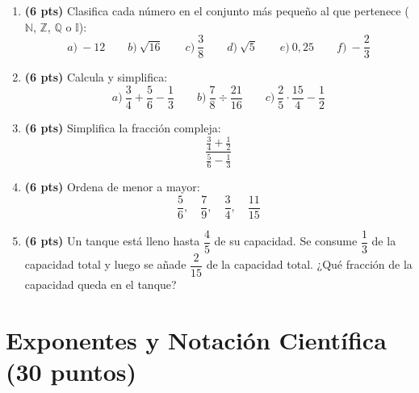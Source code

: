 \documentclass[12pt, letterpaper]{article}
\newcommand{\N}{\mathbb{N}}
\newcommand{\Z}{\mathbb{Z}}
\newcommand{\Q}{\mathbb{Q}}
\newcommand{\I}{\mathbb{I}}
\begin{document}
\begin{enumerate}[leftmargin=*]
  \item \textbf{(6 pts)} Clasifica cada número en el conjunto más pequeño al que pertenece ($\N$, $\Z$, $\Q$ o $\I$):
        \[
          a)\ -12 \qquad b)\ \sqrt{16} \qquad c)\ \frac{3}{8} \qquad d)\ \sqrt{5} \qquad e)\ 0{,}25 \qquad f)\ -\frac{2}{3}
        \]

  \item \textbf{(6 pts)} Calcula y simplifica:
        \[
          a)\ \frac{3}{4} + \frac{5}{6} - \frac{1}{3} \qquad b)\ \frac{7}{8} \div \frac{21}{16} \qquad c)\ \frac{2}{5} \cdot \frac{15}{4} - \frac{1}{2}
        \]

  \item \textbf{(6 pts)} Simplifica la fracción compleja:
        \[
          \frac{\frac{3}{4} + \frac{1}{2}}{\frac{5}{6} - \frac{1}{3}}
        \]

  \item \textbf{(6 pts)} Ordena de menor a mayor:
        \[
          \frac{5}{6}, \quad \frac{7}{9}, \quad \frac{3}{4}, \quad \frac{11}{15}
        \]

  \item \textbf{(6 pts)} Un tanque está lleno hasta $\dfrac{4}{5}$ de su capacidad. Se consume $\dfrac{1}{3}$ de la capacidad total y luego se añade $\dfrac{2}{15}$ de la capacidad total. ¿Qué fracción de la capacidad queda en el tanque?
\end{enumerate}

\newpage

\section{Exponentes y Notación Científica (30 puntos)}
\end{document}
